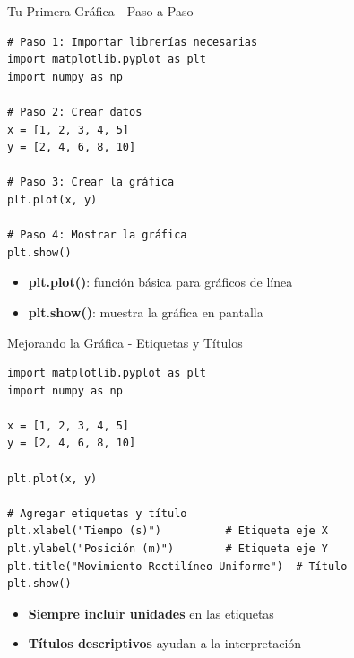 \documentclass[10pt]{beamer}
\begin{document}
\begin{frame}[fragile]{Tu Primera Gráfica - Paso a Paso}
\begin{verbatim}
# Paso 1: Importar librerías necesarias
import matplotlib.pyplot as plt
import numpy as np

# Paso 2: Crear datos
x = [1, 2, 3, 4, 5]
y = [2, 4, 6, 8, 10]

# Paso 3: Crear la gráfica
plt.plot(x, y)

# Paso 4: Mostrar la gráfica
plt.show()
\end{verbatim}

\begin{itemize}
  \item \textbf{plt.plot()}: función básica para gráficos de línea
  \item \textbf{plt.show()}: muestra la gráfica en pantalla
\end{itemize}
\end{frame}

\begin{frame}[fragile]{Mejorando la Gráfica - Etiquetas y Títulos}
\begin{verbatim}
import matplotlib.pyplot as plt
import numpy as np

x = [1, 2, 3, 4, 5]
y = [2, 4, 6, 8, 10]

plt.plot(x, y)

# Agregar etiquetas y título
plt.xlabel("Tiempo (s)")          # Etiqueta eje X
plt.ylabel("Posición (m)")        # Etiqueta eje Y
plt.title("Movimiento Rectilíneo Uniforme")  # Título
plt.show()
\end{verbatim}

\begin{itemize}
  \item \textbf{Siempre incluir unidades} en las etiquetas
  \item \textbf{Títulos descriptivos} ayudan a la interpretación
\end{itemize}
\end{frame}
\end{document}
